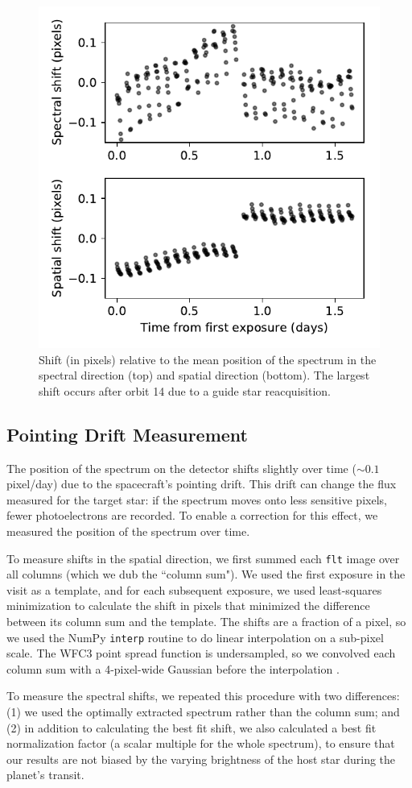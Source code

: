 \documentclass[twocolumn]{aastex62}
\begin{document}
\begin{figure}
\includegraphics[width = 0.5 \textwidth]{figures/fig4_shifts.pdf}
    \caption{Shift (in pixels) relative to the mean position of the spectrum in the spectral direction (top) and spatial direction (bottom). The largest shift occurs after orbit 14 due to a guide star reacquisition.}
\label{fig:shifts}
\end{figure}

\subsection{Pointing Drift Measurement}
The position of the spectrum on the detector shifts slightly over time ($\sim0.1$ pixel/day) due to the spacecraft's pointing drift. This drift can change the flux measured for the target star: if the spectrum moves onto less sensitive pixels, fewer photoelectrons are recorded. To enable a correction for this effect, we measured the position of the spectrum over time.  

To measure shifts in the spatial direction, we first summed each \texttt{flt} image over all columns (which we dub the ``column sum"). We used the first exposure in the visit as a template, and for each subsequent exposure, we used least-squares minimization to calculate the shift in pixels that minimized the difference between its column sum and the template. The shifts are a fraction of a pixel, so we used the NumPy \texttt{interp} routine to do linear interpolation on a sub-pixel scale. The WFC3 point spread function is undersampled, so we convolved each column sum with a 4-pixel-wide Gaussian  before the interpolation \citep[following][]{deming13}.  

To measure the spectral shifts, we repeated this procedure with two differences: (1) we used the optimally extracted spectrum rather than the column sum; and (2) in addition to calculating the best fit shift, we also calculated a best fit normalization factor (a scalar multiple for the whole spectrum), to ensure that our results are not biased by the varying brightness of the host star during the planet's transit. 
\end{document}
